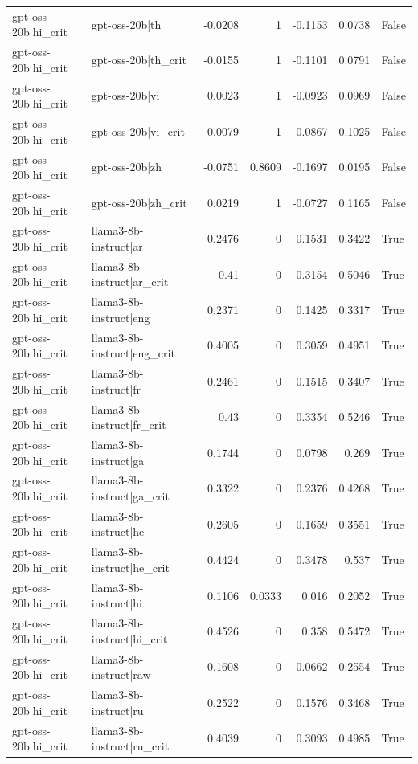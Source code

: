 \begin{table}
\begin{tabular}{l l r r r r l}
gpt-oss-20b|hi_crit & gpt-oss-20b|th & -0.0208 & 1 & -0.1153 & 0.0738 & False \\
gpt-oss-20b|hi_crit & gpt-oss-20b|th_crit & -0.0155 & 1 & -0.1101 & 0.0791 & False \\
gpt-oss-20b|hi_crit & gpt-oss-20b|vi & 0.0023 & 1 & -0.0923 & 0.0969 & False \\
gpt-oss-20b|hi_crit & gpt-oss-20b|vi_crit & 0.0079 & 1 & -0.0867 & 0.1025 & False \\
gpt-oss-20b|hi_crit & gpt-oss-20b|zh & -0.0751 & 0.8609 & -0.1697 & 0.0195 & False \\
gpt-oss-20b|hi_crit & gpt-oss-20b|zh_crit & 0.0219 & 1 & -0.0727 & 0.1165 & False \\
gpt-oss-20b|hi_crit & llama3-8b-instruct|ar & 0.2476 & 0 & 0.1531 & 0.3422 & True \\
gpt-oss-20b|hi_crit & llama3-8b-instruct|ar_crit & 0.41 & 0 & 0.3154 & 0.5046 & True \\
gpt-oss-20b|hi_crit & llama3-8b-instruct|eng & 0.2371 & 0 & 0.1425 & 0.3317 & True \\
gpt-oss-20b|hi_crit & llama3-8b-instruct|eng_crit & 0.4005 & 0 & 0.3059 & 0.4951 & True \\
gpt-oss-20b|hi_crit & llama3-8b-instruct|fr & 0.2461 & 0 & 0.1515 & 0.3407 & True \\
gpt-oss-20b|hi_crit & llama3-8b-instruct|fr_crit & 0.43 & 0 & 0.3354 & 0.5246 & True \\
gpt-oss-20b|hi_crit & llama3-8b-instruct|ga & 0.1744 & 0 & 0.0798 & 0.269 & True \\
gpt-oss-20b|hi_crit & llama3-8b-instruct|ga_crit & 0.3322 & 0 & 0.2376 & 0.4268 & True \\
gpt-oss-20b|hi_crit & llama3-8b-instruct|he & 0.2605 & 0 & 0.1659 & 0.3551 & True \\
gpt-oss-20b|hi_crit & llama3-8b-instruct|he_crit & 0.4424 & 0 & 0.3478 & 0.537 & True \\
gpt-oss-20b|hi_crit & llama3-8b-instruct|hi & 0.1106 & 0.0333 & 0.016 & 0.2052 & True \\
gpt-oss-20b|hi_crit & llama3-8b-instruct|hi_crit & 0.4526 & 0 & 0.358 & 0.5472 & True \\
gpt-oss-20b|hi_crit & llama3-8b-instruct|raw & 0.1608 & 0 & 0.0662 & 0.2554 & True \\
gpt-oss-20b|hi_crit & llama3-8b-instruct|ru & 0.2522 & 0 & 0.1576 & 0.3468 & True \\
gpt-oss-20b|hi_crit & llama3-8b-instruct|ru_crit & 0.4039 & 0 & 0.3093 & 0.4985 & True \\

\end{tabular}
\end{table}

